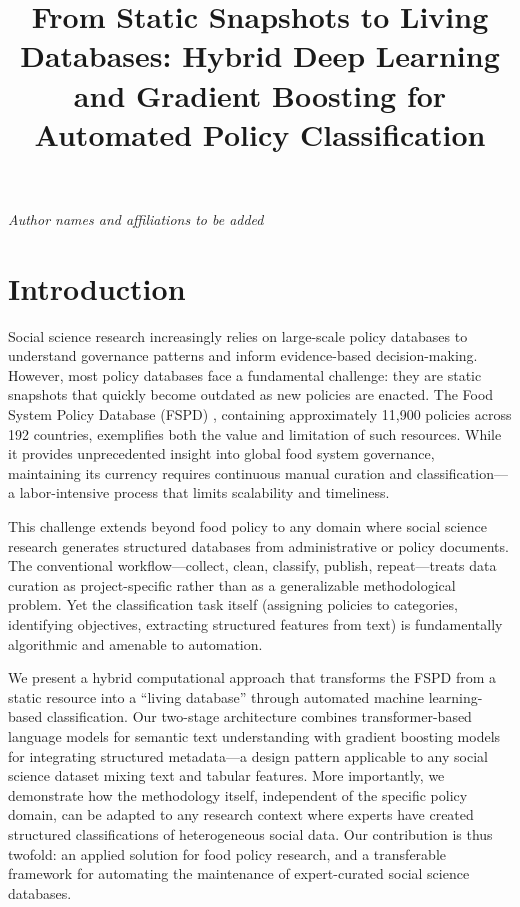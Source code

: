 \documentclass[a4paper,12pt]{article}
\title{From Static Snapshots to Living Databases: Hybrid Deep Learning and Gradient Boosting for Automated Policy Classification}
\date{}
\begin{document}
\maketitle
\thispagestyle{fancy}

\begin{center}
\textit{Author names and affiliations to be added}
\end{center}

\section*{Introduction}

Social science research increasingly relies on large-scale policy databases to understand governance patterns and inform evidence-based decision-making. However, most policy databases face a fundamental challenge: they are static snapshots that quickly become outdated as new policies are enacted. The Food System Policy Database (FSPD) \cite{lowder2025}, containing approximately 11,900 policies across 192 countries, exemplifies both the value and limitation of such resources. While it provides unprecedented insight into global food system governance, maintaining its currency requires continuous manual curation and classification---a labor-intensive process that limits scalability and timeliness.

This challenge extends beyond food policy to any domain where social science research generates structured databases from administrative or policy documents. The conventional workflow---collect, clean, classify, publish, repeat---treats data curation as project-specific rather than as a generalizable methodological problem. Yet the classification task itself (assigning policies to categories, identifying objectives, extracting structured features from text) is fundamentally algorithmic and amenable to automation.

We present a hybrid computational approach that transforms the FSPD from a static resource into a ``living database'' through automated machine learning-based classification. Our two-stage architecture combines transformer-based language models for semantic text understanding with gradient boosting models for integrating structured metadata---a design pattern applicable to any social science dataset mixing text and tabular features. More importantly, we demonstrate how the methodology itself, independent of the specific policy domain, can be adapted to any research context where experts have created structured classifications of heterogeneous social data. Our contribution is thus twofold: an applied solution for food policy research, and a transferable framework for automating the maintenance of expert-curated social science databases.
\end{document}
